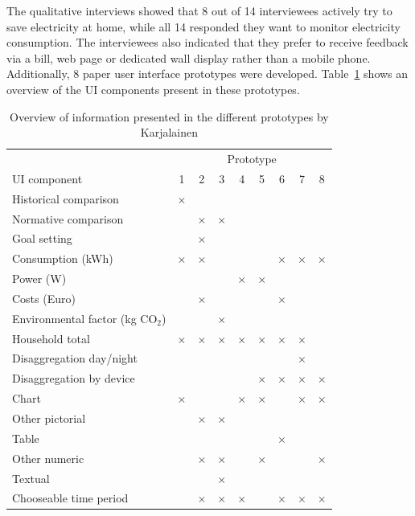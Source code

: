 \documentclass[journal]{vgtc}                %
\begin{document}
The qualitative interviews showed that 8 out of 14 interviewees actively try to save electricity at home, while all 14 responded they want to monitor electricity consumption. The interviewees also indicated that they prefer to receive feedback via a bill, web page or dedicated wall display rather than a mobile phone. \\

Additionally, 8 paper user interface prototypes were developed. Table~\ref{prototypes} shows an overview of the UI components present in these prototypes. 

\begin{table}
  \caption{Overview of information presented in the different prototypes by Karjalainen\cite{karjalainen2011consumer}}
  \label{prototypes}
  \scriptsize
  \begin{center}
    \begin{tabular}{|l|cccccccc|}
    \hline
      & \multicolumn{8}{|c|}{Prototype} \\
    
      UI component & 1 & 2 & 3 & 4 & 5 & 6 & 7 & 8 \\
    \hline
      Historical comparison & $\times$ &  &  &  &  &  &  & \\ \hline
      Normative comparison &  & $\times$ & $\times$ &  &  &  &  & \\ \hline
      Goal setting &  & $\times$ &  &  &  &  &  & \\ \hline
      Consumption (kWh) & $\times$ & $\times$ &  &  &  & $\times$ & $\times$ & $\times$ \\ \hline
      Power (W) &  &  &  & $\times$ & $\times$ &  &  & \\ \hline
      Costs (Euro) &  & $\times$ &  &  &  & $\times$ &  & \\ \hline
      Environmental factor (kg CO$_2$) &  &  & $\times$ &  &  &  &  & \\ \hline
      Household total & $\times$ & $\times$ & $\times$ & $\times$ & $\times$ & $\times$ & $\times$ & \\ \hline
      Disaggregation day/night &  &  &  &  &  &  & $\times$ & \\ \hline
      Disaggregation by device &  &  &  &  & $\times$ & $\times$ & $\times$ & $\times$ \\ \hline
      Chart & $\times$ &  &  & $\times$ & $\times$ &  & $\times$ & $\times$ \\ \hline
      Other pictorial &  & $\times$ & $\times$ &  &  &  &  & \\ \hline
      Table &  &  &  &  &  & $\times$ &  & \\ \hline
      Other numeric &  & $\times$ & $\times$ &  & $\times$ &  &  & $\times$ \\ \hline
      Textual &  &  & $\times$ &  &  &  &  & \\ \hline
      Chooseable time period &  & $\times$ & $\times$ & $\times$ &  & $\times$ & $\times$ &  $\times$ \\ \hline
    \end{tabular}
  \end{center}
\end{table}
\end{document}
